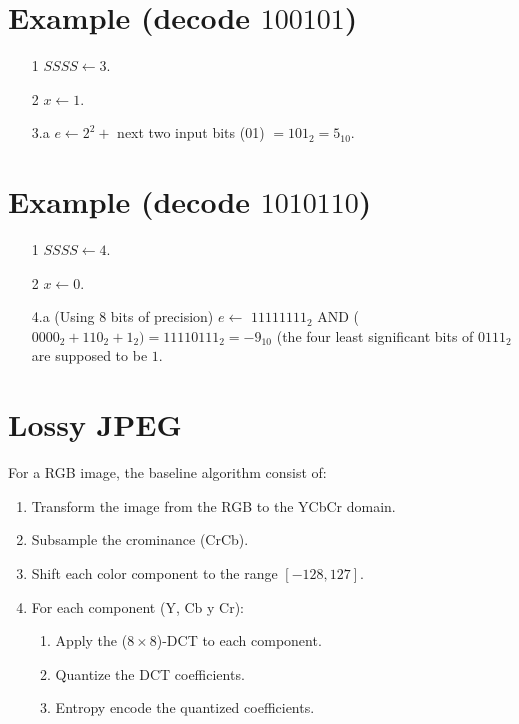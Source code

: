 \section*{Example (decode $100101$)}  
\begin{itemize}
\item [1] $SSSS\leftarrow 3$.
\item [2] $x\leftarrow 1$.
\item [3.a] $e\leftarrow 2^2+$ next two input bits (01) $=101_2=5_{10}$.
\end{itemize}

\section*{Example (decode $1010110$)}
\begin{itemize}
\item [1] $SSSS\leftarrow 4$.
\item [2] $x\leftarrow 0$.
\item [4.a] (Using 8 bits of precision) $e\leftarrow$ $11111111_2$ AND
  ($0000_2+110_2+1_2) = 11110111_2 = -9_{10}$ (the four least
  significant bits of $0111_2$ are supposed to be $1$.
\end{itemize}


\section{Lossy JPEG}
\noindent For a RGB image, the baseline algorithm consist of:
\begin{enumerate}
\item Transform the image from the RGB to the YCbCr domain.
\item Subsample the crominance (CrCb).
\item Shift each color component to the range $[-128,127]$.
\item For each component (Y, Cb y Cr):
  \begin{enumerate}
  \item Apply the ($8\times 8$)-DCT to each component.
  \item Quantize the DCT coefficients.
  \item Entropy encode the quantized coefficients. 
  \end{enumerate}
\end{enumerate}

